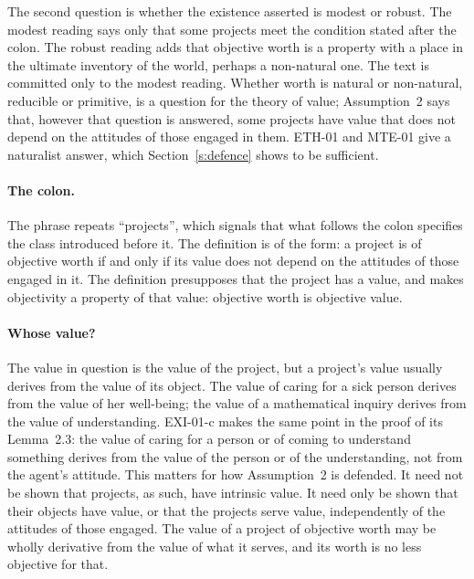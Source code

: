 The second question is whether the existence asserted is modest or robust. The modest reading says only that some projects meet the condition stated after the colon. The robust reading adds that objective worth is a property with a place in the ultimate inventory of the world, perhaps a non-natural one. The text is committed only to the modest reading. Whether worth is natural or non-natural, reducible or primitive, is a question for the theory of value; Assumption~2 says that, however that question is answered, some projects have value that does not depend on the attitudes of those engaged in them. ETH-01 and MTE-01 give a naturalist answer, which Section~\ref{s:defence} shows to be sufficient.


\paragraph{The colon.} The phrase repeats \enquote{projects}, which signals that what follows the colon specifies the class introduced before it. The definition is of the form: a project is of objective worth if and only if its value does not depend on the attitudes of those engaged in it. The definition presupposes that the project has a value, and makes objectivity a property of that value: objective worth is objective value.

\paragraph{Whose value?} The value in question is the value of the project, but a project's value usually derives from the value of its object. The value of caring for a sick person derives from the value of her well-being; the value of a mathematical inquiry derives from the value of understanding. EXI-01-c makes the same point in the proof of its Lemma~2.3: the value of caring for a person or of coming to understand something derives from the value of the person or of the understanding, not from the agent's attitude. This matters for how Assumption~2 is defended. It need not be shown that projects, as such, have intrinsic value. It need only be shown that their objects have value, or that the projects serve value, independently of the attitudes of those engaged. The value of a project of objective worth may be wholly derivative from the value of what it serves, and its worth is no less objective for that.

